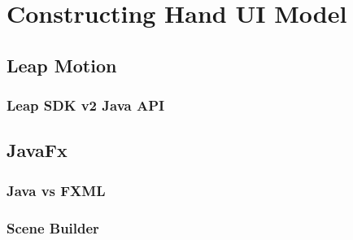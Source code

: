\chapter{Constructing Hand UI Model}

\label{Chapter2} 

\begin{comment}
-------------------------------------------------
3. Constructing Hand UI Model
	a. Basic 3D Modelling
	b. Set Location Method
	c. Concurrency
-------------------------------------------------
\end{comment}




\section{Leap Motion}
	
\subsection{Leap SDK v2 Java API}




\section{JavaFx}


\subsection{Java vs FXML}


\subsection{Scene Builder}


